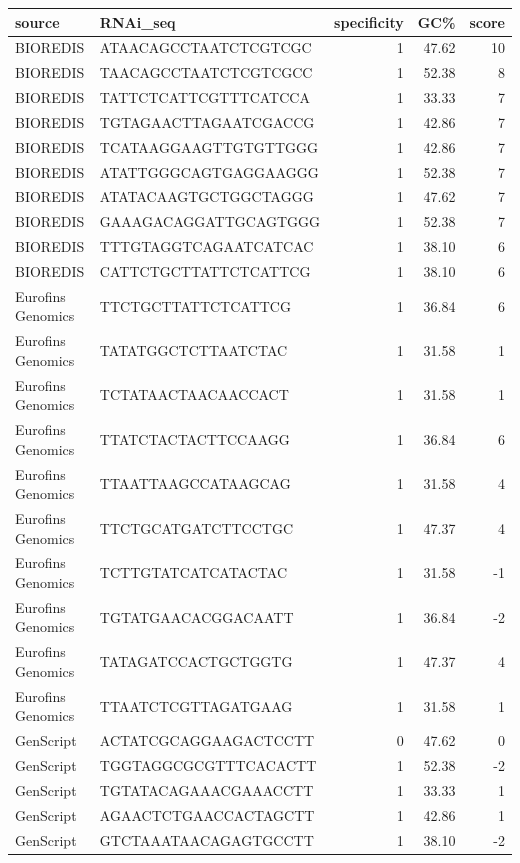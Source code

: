 \documentclass[
]{article}
\begin{document}
\begin{longtable}[]{@{}llrrr@{}}
\toprule\noalign{}
source & RNAi\_seq & specificity & GC\% & score \\
\midrule\noalign{}
\endhead
\bottomrule\noalign{}
\endlastfoot
BIOREDIS & ATAACAGCCTAATCTCGTCGC & 1 & 47.62 & 10 \\
BIOREDIS & TAACAGCCTAATCTCGTCGCC & 1 & 52.38 & 8 \\
BIOREDIS & TATTCTCATTCGTTTCATCCA & 1 & 33.33 & 7 \\
BIOREDIS & TGTAGAACTTAGAATCGACCG & 1 & 42.86 & 7 \\
BIOREDIS & TCATAAGGAAGTTGTGTTGGG & 1 & 42.86 & 7 \\
BIOREDIS & ATATTGGGCAGTGAGGAAGGG & 1 & 52.38 & 7 \\
BIOREDIS & ATATACAAGTGCTGGCTAGGG & 1 & 47.62 & 7 \\
BIOREDIS & GAAAGACAGGATTGCAGTGGG & 1 & 52.38 & 7 \\
BIOREDIS & TTTGTAGGTCAGAATCATCAC & 1 & 38.10 & 6 \\
BIOREDIS & CATTCTGCTTATTCTCATTCG & 1 & 38.10 & 6 \\
Eurofins Genomics & TTCTGCTTATTCTCATTCG & 1 & 36.84 & 6 \\
Eurofins Genomics & TATATGGCTCTTAATCTAC & 1 & 31.58 & 1 \\
Eurofins Genomics & TCTATAACTAACAACCACT & 1 & 31.58 & 1 \\
Eurofins Genomics & TTATCTACTACTTCCAAGG & 1 & 36.84 & 6 \\
Eurofins Genomics & TTAATTAAGCCATAAGCAG & 1 & 31.58 & 4 \\
Eurofins Genomics & TTCTGCATGATCTTCCTGC & 1 & 47.37 & 4 \\
Eurofins Genomics & TCTTGTATCATCATACTAC & 1 & 31.58 & -1 \\
Eurofins Genomics & TGTATGAACACGGACAATT & 1 & 36.84 & -2 \\
Eurofins Genomics & TATAGATCCACTGCTGGTG & 1 & 47.37 & 4 \\
Eurofins Genomics & TTAATCTCGTTAGATGAAG & 1 & 31.58 & 1 \\
GenScript & ACTATCGCAGGAAGACTCCTT & 0 & 47.62 & 0 \\
GenScript & TGGTAGGCGCGTTTCACACTT & 1 & 52.38 & -2 \\
GenScript & TGTATACAGAAACGAAACCTT & 1 & 33.33 & 1 \\
GenScript & AGAACTCTGAACCACTAGCTT & 1 & 42.86 & 1 \\
GenScript & GTCTAAATAACAGAGTGCCTT & 1 & 38.10 & -2 \\

\end{longtable}
\end{document}
